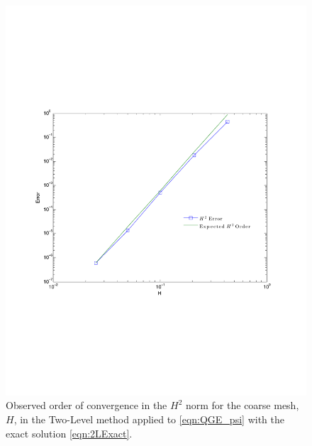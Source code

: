 \begin{figure}
  \begin{center}
    \includegraphics[scale=0.6]{Figures/CoarseConvergence.pdf}
    \caption{Observed order of convergence in the $H^2$ norm for the coarse
      mesh, $H$, in the Two-Level method applied to \eqref{eqn:QGE_psi} with the
      exact solution \eqref{eqn:2LExact}.}
  \label{fig:TwoLevelH}
  \end{center}
\end{figure}

